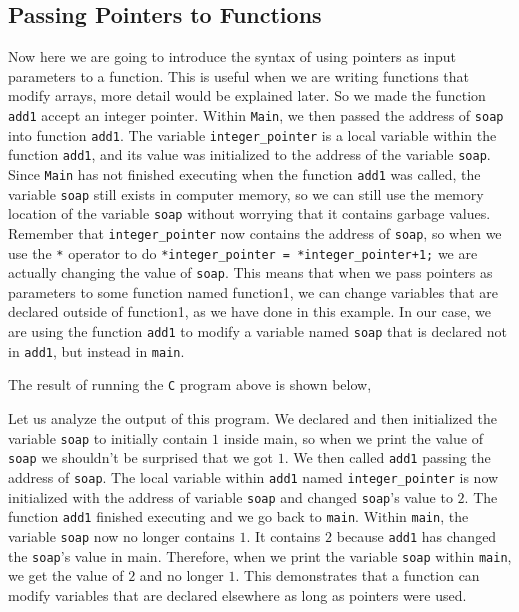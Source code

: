 \documentclass[a4paper, 12pt]{report}
\begin{document}
\begin{center}
\subsection{Passing Pointers to Functions}
\begin{comment}
\end{comment}
Now here we are going to introduce the syntax of using pointers as input parameters to a function.
This is useful when we are writing functions that modify arrays, more detail would be explained later. 
So we made the function \texttt{add1} accept an integer pointer.
Within \texttt{Main}, we then passed the address of \texttt{soap} into function \texttt{add1}. 
The variable \texttt{integer\_pointer} is a local variable within the function \texttt{add1}, and its value was initialized to the address of the variable \texttt{soap}.
Since \texttt{Main} has not finished executing when the function \texttt{add1} was called, the variable \texttt{soap} still exists in computer memory, so we can still use the memory location of the variable \texttt{soap} without worrying that it contains garbage values.
Remember that \texttt{integer\_pointer} now contains the address of \texttt{soap}, so when we use the \texttt{*} operator to do \texttt{*integer\_pointer = *integer\_pointer+1;} we are actually changing the value of \texttt{soap}. 
This means that when we pass pointers as parameters to some function named function1, we can change variables that are declared outside of function1, as we have done in this example.
In our case, we are using the function \texttt{add1} to modify a variable named \texttt{soap} that is declared not in \texttt{add1}, but instead in \texttt{main}.

The result of running the \texttt{C} program above is shown below,

Let us analyze the output of this program.
We declared and then initialized the variable \texttt{soap} to initially contain $1$ inside main, so when we print the value of \texttt{soap} we shouldn't be surprised that we got $1$.
We then called \texttt{add1} passing the address of \texttt{soap}. 
The local variable within \texttt{add1} named \texttt{integer\_pointer} is now initialized with the address of variable \texttt{soap} and changed \texttt{soap}'s value to $2$.
The function \texttt{add1} finished executing and we go back to \texttt{main}. 
Within \texttt{main}, the variable \texttt{soap} now no longer contains $1$.
It contains $2$ because \texttt{add1} has changed the \texttt{soap}'s value in main.
Therefore, when we print the variable \texttt{soap} within \texttt{main}, we get the value of $2$ and no longer $1$.
This demonstrates that a function can modify variables that are declared elsewhere as long as pointers were used.


\end{center}
\end{document}
